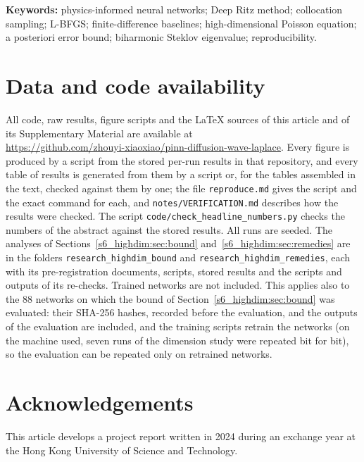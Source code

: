 \documentclass[11pt,a4paper]{article}
\begin{document}
\noindent\textbf{Keywords:} physics-informed neural networks; Deep Ritz method; collocation
sampling; L-BFGS; finite-difference baselines; high-dimensional Poisson equation; a posteriori
error bound; biharmonic Steklov eigenvalue; reproducibility.










\section*{Data and code availability}
All code, raw results, figure scripts and the \LaTeX{} sources of this article and of its
Supplementary Material are available at\\
\url{https://github.com/zhouyi-xiaoxiao/pinn-diffusion-wave-laplace}. Every figure is
produced by a script from the stored per-run results in that repository, and every table
of results is generated from them by a script or, for the tables assembled in the text,
checked against them by one; the file \texttt{reproduce.md} gives the script and the exact
command for each, and \texttt{notes/VERIFICATION.md} describes how the results were
checked. The script \texttt{code/\allowbreak check\_headline\_numbers.py} checks the numbers
of the abstract against the stored results. All runs are seeded. The analyses of
Sections~\ref{s6_highdim:sec:bound} and~\ref{s6_highdim:sec:remedies} are in the folders
\texttt{research\_\allowbreak highdim\_\allowbreak bound} and
\texttt{research\_\allowbreak highdim\_\allowbreak remedies}, each with its pre-registration
documents, scripts, stored results and the scripts and outputs of its re-checks.
Trained networks are not included. This applies also to the 88 networks on which the bound of
Section~\ref{s6_highdim:sec:bound} was evaluated: their SHA-256 hashes, recorded before the
evaluation, and the outputs of the evaluation are included, and the training scripts retrain the
networks (on the machine used, seven runs of the dimension study were repeated bit for bit), so
the evaluation can be repeated only on retrained networks.

\section*{Acknowledgements}
This article develops a project report written in 2024 during an exchange year at the Hong Kong University of Science and Technology.



\end{document}
